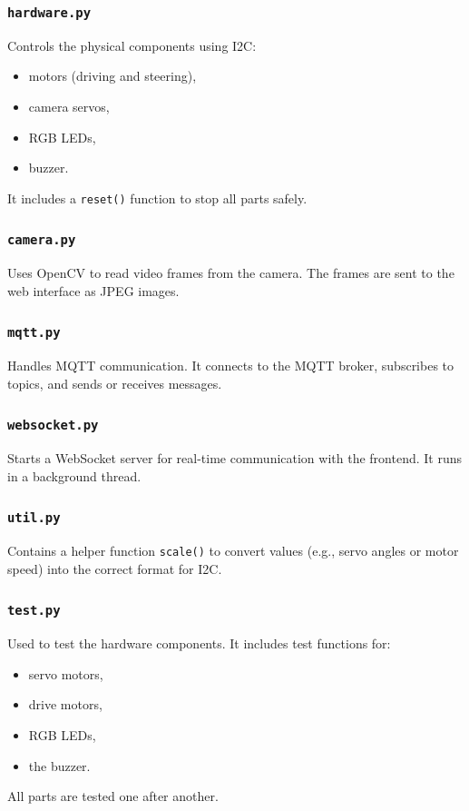 \subsubsection*{\texttt{hardware.py}}
Controls the physical components using I2C:
\begin{itemize}
    \item motors (driving and steering),
    \item camera servos,
    \item RGB LEDs,
    \item buzzer.
\end{itemize}
It includes a \texttt{reset()} function to stop all parts safely.

\subsubsection*{\texttt{camera.py}}
Uses OpenCV to read video frames from the camera. The frames are sent to the web interface as JPEG images.

\subsubsection*{\texttt{mqtt.py}}
Handles MQTT communication. It connects to the MQTT broker, subscribes to topics, and sends or receives messages.

\subsubsection*{\texttt{websocket.py}}
Starts a WebSocket server for real-time communication with the frontend. It runs in a background thread.

\subsubsection*{\texttt{util.py}}
Contains a helper function \texttt{scale()} to convert values (e.g., servo angles or motor speed) into the correct format for I2C.

\subsubsection*{\texttt{test.py}}
Used to test the hardware components. It includes test functions for:
\begin{itemize}
    \item servo motors,
    \item drive motors,
    \item RGB LEDs,
    \item the buzzer.
\end{itemize}
All parts are tested one after another.





